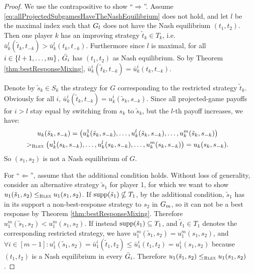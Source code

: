 \documentclass[a4paper]{scrreprt}
\theoremstyle{definition}
\begin{document}
    \begin{proof}
        We use the contrapositive to show “$\Rightarrow$”. Assume \eqref{eq:allProjectedSubgamesHaveTheNashEquilibrium} does not hold, and let $l$ be the maximal index such that $G_{l}$ does not have the Nash equilibrium $(t_1, t_2)$.
        Then one player $k$ has an improving strategy $\tilde{t}_k \in T_k$, i.e.
        $\bar{u}_k^l(\tilde{t}_k, t_{-k}) > \bar{u}_k^l(t_k, t_{-k})$.
        Furthermore since $l$ is maximal, for all $i \in \{l+1, \dots, m\}$, $\bar{G}_{i}$ has $(t_1, t_2)$ as Nash equilibrium.
        So by Theorem \ref{thm:bestResponseMixing}, $\bar{u}_k^i(\tilde{t}_k, t_{-k}) = \bar{u}_k^i(t_k, t_{-k})$.
        
        Denote by $\tilde{s}_k \in S_k$ the strategy for $G$ corresponding to the restricted strategy $\tilde{t}_k$.
        Obviously for all $i$, $\bar{u}_k^i(\tilde{t}_k, t_{-k}) = u_k^i(\tilde{s}_k, s_{-k})$.
        Since all projected-game payoffs for $i > l$ stay equal by switching from $s_k$ to $\tilde{s}_k$, but the $l$-th payoff increases, we have:
        \begin{multline*}
                         u_k(\tilde{s}_k, s_{-k}) 
                       = \bigl(u_k^{1}(\tilde{s}_k, s_{-k}), \dots, u_k^l(\tilde{s}_k, s_{-k}), \dots, u_k^{m}(\tilde{s}_k, s_{-k})\bigr) \\
            >_{\textsc{Rlex}} \bigl(u_k^{1}(s_k, s_{-k}), \dots, u_k^l(s_k, s_{-k}), \dots, u_k^{m}(s_k, s_{-k})\bigr)
                       = u_k(s_k, s_{-k}).
        \end{multline*}
        So $(s_1, s_2)$ is not a Nash equilibrium of $G$.
        
        For “$\Leftarrow$”, assume that the additional condition holds.
        Without loss of generality, consider an alternative strategy $\tilde{s}_1$ for player 1, for which we want to show $u_1(\tilde{s}_1, s_2) \leq_{\textsc{Rlex}} u_1(s_1, s_2)$.
        If $\operatorname{supp} (\tilde{s}_1) \nsubseteq T_1$, by the additional condition, $\tilde{s}_1$ has in its support a non-best-response strategy to $s_2$ in $G_{m}$, so it can not be a best response by Theorem \ref{thm:bestResponseMixing}. Therefore $u_1^m(\tilde{s}_1, s_2) < u_1^m(s_1, s_2)$.
        If instead $\operatorname{supp} (\tilde{s}_1) \subseteq T_1$, and $\tilde{t}_1 \in T_1$ denotes the corresponding restricted strategy,
        we have $u_1^m(\tilde{s}_1, s_2) = u_1^m(s_1, s_2)$, and  $\forall i \in [m - 1]: u_1^i(\tilde{s}_1, s_2) = \bar{u}_1^i(\tilde{t}_1, t_2) \leq \bar{u}_1^i(t_1, t_2) = u_1^i(s_1, s_2)$ because $(t_1, t_2)$ is a Nash equilibrium in every $\bar{G}_{i}$. Therefore $u_1(\tilde{s}_1, s_2) \leq_{\textsc{Rlex}} u_1(s_1, s_2)$.
    \end{proof}
\end{document}
